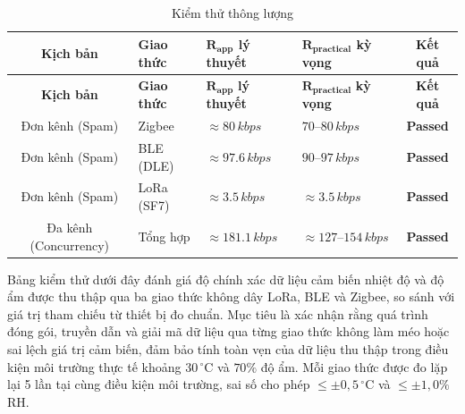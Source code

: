         \begin{longtable}{|c|p{2.5cm}|p{3cm}|p{3.5cm}|c|}
            \caption{Kiểm thử thông lượng}
            \label{tab:test_throughput} \\
            \hline
            \textbf{Kịch bản} & \textbf{Giao thức} & $\boldsymbol{R_{app}}$ \textbf{lý thuyết} & $\boldsymbol{R_{practical}}$ \textbf{kỳ vọng} & \textbf{Kết quả} \\ \hline
            \endfirsthead
            \hline
            \textbf{Kịch bản} & \textbf{Giao thức} & $\boldsymbol{R_{app}}$ \textbf{lý thuyết} & $\boldsymbol{R_{practical}}$ \textbf{kỳ vọng} & \textbf{Kết quả} \\ \hline
            \endhead
            \hline
            \endfoot
            \endlastfoot

            Đơn kênh (Spam) & Zigbee & $\approx 80\,kbps$ & $70$--$80\,kbps$ & \textcolor{modern_blue}{\textbf{Passed}} \\ \hline
            Đơn kênh (Spam) & BLE (DLE) & $\approx 97.6\,kbps$ & $90$--$97\,kbps$ & \textcolor{modern_blue}{\textbf{Passed}} \\ \hline
            Đơn kênh (Spam) & LoRa (SF7) & $\approx 3.5\,kbps$ & $\approx 3.5\,kbps$ & \textcolor{modern_blue}{\textbf{Passed}} \\ \hline
            Đa kênh (Concurrency) & Tổng hợp & $\approx 181.1\,kbps$ & $\approx 127$--$154\,kbps$ & \textcolor{modern_blue}{\textbf{Passed}} \\ \hline
        \end{longtable}

        Bảng kiểm thử dưới đây đánh giá độ chính xác dữ liệu cảm biến nhiệt độ và độ ẩm được thu thập qua ba giao thức không dây LoRa, BLE và Zigbee, so sánh với giá trị tham chiếu từ thiết bị đo chuẩn. Mục tiêu là xác nhận rằng quá trình đóng gói, truyền dẫn và giải mã dữ liệu qua từng giao thức không làm méo hoặc sai lệch giá trị cảm biến, đảm bảo tính toàn vẹn của dữ liệu thu thập trong điều kiện môi trường thực tế khoảng $30\,{^\circ}\text{C}$ và $70\%$ độ ẩm. Mỗi giao thức được đo lặp lại 5 lần tại cùng điều kiện môi trường, sai số cho phép $\leq \pm 0{,}5\,{^\circ}\text{C}$ và $\leq \pm 1{,}0\%$ RH.

